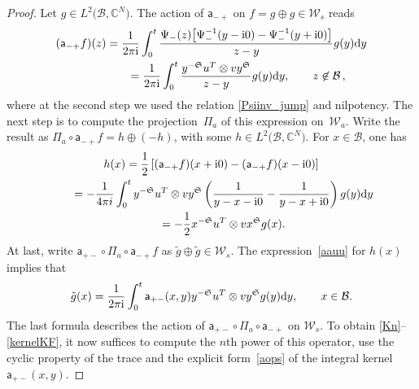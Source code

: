 \documentclass[pdftex]{sigma}
\def\mf{\mathfrak}
\numberwithin{equation}{section}
\begin{document}
\begin{proof} Let $g\in L^2\big(\mathcal B,\mathbb{C}^N\big)$. The action of $\mathsf a_{-+}$ on $f=g\oplus g\in\mathcal W_s$ reads
\begin{gather*}
(\mathsf a_{-+} f)(z)= \frac{1}{2\pi{\rm i}} \int_0^t \frac{\Psi_-(z)\big[ \Psi_-^{-1}(y-{\rm i}0)-\Psi_-^{-1}(y+{\rm i}0)\big]}{z-y} g(y) {\rm d}y \\
\hphantom{(\mathsf a_{-+} f)(z)}{} = \frac{1}{2\pi{\rm i}} \int_0^t \frac{ y^{-\mf{S}} u^T \otimes v y^{\mf{S}} }{z-y} g(y) {\rm d}y ,\qquad z\not\in \mathcal{B}\,,
\end{gather*}
where at the second step we used the relation \eqref{Psiinv_jump} and nilpotency. The next step is to compute the projection~$\Pi_a$ of this expression on~$\mathcal W_a$. Write the result as $\Pi_a\circ \mathsf a_{-+} f=h\oplus(-h)$, with some $h\in L^2\big(\mathcal B,\mathbb{C}^N\big)$. For $x\in \mathcal B$, one has
\begin{gather}
 h(x)=\frac12\left[(\mathsf a_{-+} f)(x+{\rm i}0)-(\mathsf a_{-+} f)(x-{\rm i}0)\right] \nonumber\\
\hphantom{h(x)}{} =-\frac{1}{4\pi i} \int_{0}^{t} y^{-\mf{S}} u^T \otimes v y^{\mf{S}} \left(\frac{1}{y-x-{\rm i}0}-\frac{1}{y-x+{\rm i}0} \right) g(y) {\rm d}y \nonumber\\
\label{aauu} \hphantom{h(x)}{}=-\frac{1}{2} x^{-\mf{S}} u^T \otimes v x^{\mf{S}} g(x) .
\end{gather}
At last, write $\mathsf a_{+-}\circ\Pi_a\circ \mathsf a_{-+} f$ as $\tilde g\oplus \tilde g\in\mathcal W_s$. The expression~\eqref{aauu} for $h(x)$ implies that
\begin{gather*}
\tilde g(x)=\frac{1}{2\pi{\rm i}} \int_0^t \mathsf a_{+-}(x,y) y^{-\mf{S}} u^T \otimes v y^{\mf{S}} g(y) {\rm d}y,\qquad x\in\mathcal B.
\end{gather*}
The last formula describes the action of $\mathsf a_{+-}\circ\Pi_a\circ \mathsf a_{-+}$ on $\mathcal W_s$. To obtain \eqref{Kn}--\eqref{kernelKF}, it now suffices to compute the $n$th power of this operator, use the cyclic property of the trace and the explicit form~\eqref{aops} of the integral kernel $\mathsf a_{+-}(x,y)$.
\end{proof}
\end{document}
